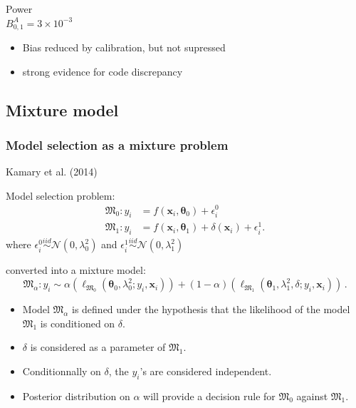 \documentclass[nopagenumber,9pt]{beamer}
\newcommand{\bx}{\mathbf{x}}
\newcommand\MF{{\mathfrak{M}}}
\begin{document}
\begin{frame}
\begin{minipage}{.5\textwidth}
\centering Power \\
$B_{0,1}^A=3\times10^{-3}$ 
\end{minipage}
\begin{itemize}
\item Bias reduced by calibration, but not supressed
\item strong evidence for code discrepancy 
\end{itemize}
 
\end{frame}








\subsection{Mixture model}

\begin{frame}
 \frametitle{Model selection as a mixture problem}
\color{blue}Kamary et al. (2014)\color{black}
 
 
 Model selection problem:
 \begin{align}\label{eq:2}
\MF_0: y_i&=f(\bx_i, \pmb{\theta}_0)+\epsilon_i^0 \nonumber\\
\MF_1: y_i&=f(\bx_i, \pmb{\theta}_1)+\delta(\bx_i)+\epsilon_i^1.\nonumber
\end{align}
where $\epsilon_i^0 \overset{iid}{\sim} \mathcal{N}(0, \lambda_0^2)$ and $\epsilon_i^1 \overset{iid}{\sim} \mathcal{N}(0, \lambda_1^2)$

\medskip

converted into a mixture model:
\begin{equation*}\label{eq:1}
\MF_\alpha: y_i\sim \alpha \left(\ell_{\MF_0}(\pmb{\theta}_0, \lambda_0^2;y_i, \bx_i)\right)+(1-\alpha)\left(\ell_{\MF_1}(\pmb{\theta}_1, \lambda_1^2, \delta;y_i, \bx_i)\right)\,.
\end{equation*}

 
 
 \medskip
 \begin{itemize}
  \item Model $\MF_\alpha$ is defined under the hypothesis that the likelihood of the model $\MF_1$ is conditioned on $\delta$.
  \item  $\delta$ is considered as a parameter of $\MF_1$.
  \item Conditionnally on $\delta$, the $y_i$'s are considered  independent.
  \item Posterior distribution on $\alpha$ will provide a decision rule for $\MF_0$ against $\MF_1$.
 \end{itemize}
\end{frame}
\end{document}
